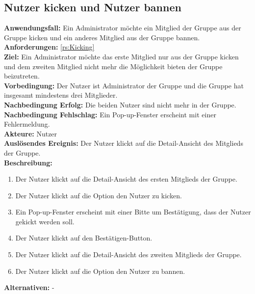 \documentclass[parskip=full]{scrartcl}
\begin{document}
\subsection{Nutzer kicken und Nutzer bannen}
\textbf{Anwendungsfall:} Ein Administrator möchte ein Mitglied der Gruppe aus der Gruppe kicken und ein anderes Mitglied aus der Gruppe bannen.\\
\textbf{Anforderungen:} \ref{rs:Kicking}\\
\textbf{Ziel:} Ein Administrator möchte das erste Mitglied nur aus der Gruppe kicken und dem zweiten Mitglied nicht mehr die Möglichkeit bieten der Gruppe beizutreten.\\
\textbf{Vorbedingung:} Der Nutzer ist Administrator der Gruppe und die Gruppe hat insgesamt mindestens drei Mitglieder.\\
\textbf{Nachbedingung Erfolg:} Die beiden Nutzer sind nicht mehr in der Gruppe.\\
\textbf{Nachbedingung Fehlschlag:} Ein Pop-up-Fenster erscheint mit einer Fehlermeldung.\\
\textbf{Akteure:} Nutzer\\
\textbf{Auslösendes Ereignis:} Der Nutzer klickt auf die Detail-Ansicht des Mitglieds der Gruppe.\\
\textbf{Beschreibung:}
\begin{enumerate}
    \item Der Nutzer klickt auf die Detail-Ansicht des ersten Mitglieds der Gruppe.
    \item Der Nutzer klickt auf die Option den Nutzer zu kicken.
    \item Ein Pop-up-Fenster erscheint mit einer Bitte um Bestätigung, dass der Nutzer gekickt werden soll.
    \item Der Nutzer klickt auf den Bestätigen-Button.
    \item Der Nutzer klickt auf die Detail-Ansicht des zweiten Mitglieds der Gruppe.
    \item Der Nutzer klickt auf die Option den Nutzer zu bannen.
\end{enumerate}
\textbf{Alternativen:} -
\newpage
\end{document}
